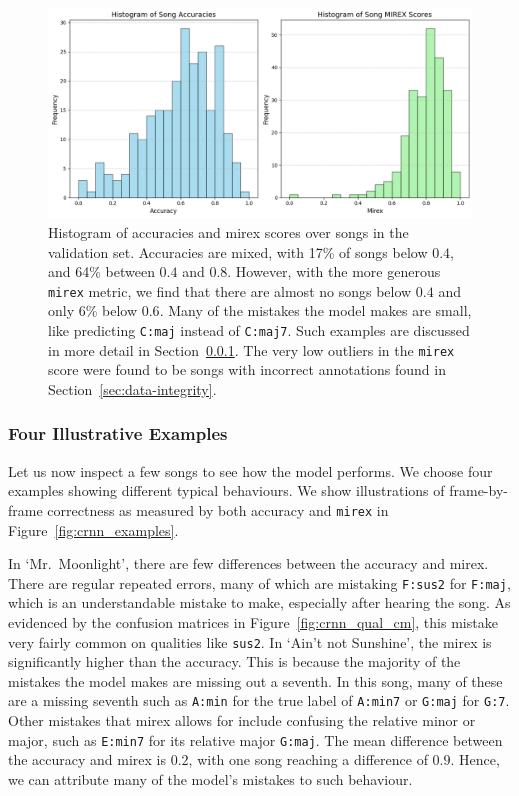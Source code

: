 \begin{figure}[H]
    \centering
    \includegraphics[width=1.0\textwidth]{figures/accuracy_mirex_histograms.png}
    \caption{Histogram of accuracies and mirex scores over songs in the validation set. Accuracies are mixed, with 17\% of songs below $0.4$, and 64\% between $0.4$ and $0.8$. However, with the more generous \texttt{mirex} metric, we find that there are almost no songs below $0.4$ and only 6\% below $0.6$. Many of the mistakes the model makes are small, like predicting \texttt{C:maj} instead of \texttt{C:maj7}. Such examples are discussed in more detail in Section~\ref{sec:crnn_examples}. The very low outliers in the \texttt{mirex} score were found to be songs with incorrect annotations found in Section~\ref{sec:data-integrity}.}\label{fig:crnn_song_hist}
\end{figure}

\subsubsection{Four Illustrative Examples}\label{sec:crnn_examples}

Let us now inspect a few songs to see how the model performs. We choose four examples showing different typical behaviours. We show illustrations of frame-by-frame correctness as measured by both accuracy and \texttt{mirex} in Figure~\ref{fig:crnn_examples}. 

In `Mr.\ Moonlight', there are few differences between the accuracy and mirex. There are regular repeated errors, many of which are mistaking \texttt{F:sus2} for \texttt{F:maj}, which is an understandable mistake to make, especially after hearing the song. As evidenced by the confusion matrices in Figure~\ref{fig:crnn_qual_cm}, this mistake very fairly common on qualities like \texttt{sus2}. In `Ain't not Sunshine', the mirex is significantly higher than the accuracy. This is because the majority of the mistakes the model makes are missing out a seventh. In this song, many of these are a missing seventh such as \texttt{A:min} for the true label of \texttt{A:min7} or \texttt{G:maj} for \texttt{G:7}. Other mistakes that mirex allows for include confusing the relative minor or major, such as \texttt{E:min7} for its relative major \texttt{G:maj}. The mean difference between the accuracy and mirex is $0.2$, with one song reaching a difference of $0.9$. Hence, we can attribute many of the model's mistakes to such behaviour. 

